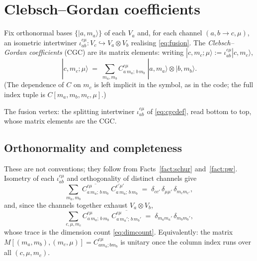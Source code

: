 \documentclass[11pt,a4paper]{article}
\theoremstyle{plain}
\theoremstyle{definition}
\newcommand{\fvert}[2]{\node[fvertex] at (#1) {};%
  \node[fleg, right=1pt] at (#1) {$#2$};}
\begin{document}
\section{Clebsch--Gordan coefficients}
\label{sec:cgc}

Fix orthonormal bases $\{|a,m_a\rangle\}$ of each $V_a$ and, for each channel
$(a,b\to c,\mu)$, an isometric intertwiner
$\iota^{c\mu}_{ab}: V_c \hookrightarrow V_a\otimes V_b$ realising
\eqref{eq:fusion}. The \emph{Clebsch--Gordan coefficients} (CGC) are its matrix
elements: writing $|c,m_c;\mu\rangle := \iota^{c\mu}_{ab}|c,m_c\rangle$,
\begin{equation}\label{eq:cgcdef}
  |c,m_c;\mu\rangle \;=\; \sum_{m_a,m_b}
    C^{c\mu}_{a\,m_a;\,b\,m_b}\;
    |a,m_a\rangle \otimes |b,m_b\rangle .
\end{equation}
(The dependence of $C$ on $m_c$ is left implicit in the symbol, as in the code;
the full index tuple is $C[m_a,m_b,m_c,\mu]$.)

\begin{center}

\smallskip
{\small The fusion vertex: the splitting intertwiner $\iota^{c\mu}_{ab}$ of
\eqref{eq:cgcdef}, read bottom to top, whose matrix elements are the CGC.}
\end{center}

\subsection{Orthonormality and completeness}

These are not conventions; they follow from Facts~\ref{fact:schur}
and~\ref{fact:pw}. Isometry of each $\iota^{c\mu}_{ab}$ and orthogonality of
distinct channels give
\begin{equation}\label{eq:ortho}
  \sum_{m_a,m_b}
    \overline{C^{c\mu}_{a\,m_a;\,b\,m_b}}\;
    C^{c'\mu'}_{a\,m_a;\,b\,m_b}
  \;=\; \delta_{cc'}\,\delta_{\mu\mu'}\,\delta_{m_c m_{c'}} ,
\end{equation}
and, since the channels together exhaust $V_a\otimes V_b$,
\begin{equation}\label{eq:complete}
  \sum_{c,\mu,m_c}
    C^{c\mu}_{a\,m_a;\,b\,m_b}\;
    \overline{C^{c\mu}_{a\,m_a';\,b\,m_b'}}
  \;=\; \delta_{m_a m_a'}\,\delta_{m_b m_b'} ,
\end{equation}
whose trace is the dimension count \eqref{eq:dimcount}. Equivalently: the
matrix $M[(m_a,m_b),(m_c,\mu)] = C^{c\mu}_{a m_a; b m_b}$ is unitary once the
column index runs over all $(c,\mu,m_c)$.
\end{document}
